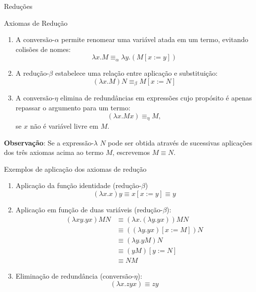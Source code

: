\begin{frame}[fragile]{Reduções}

    \begin{footnotesize}
    \begin{block}{Axiomas de Redução}
        \begin{enumerate}
            \item A conversão-$\alpha$ permite renomear uma variável atada em um termo,
            evitando colisões de nomes:
            \[
                \lambda x.M \equiv_\alpha \lambda y.(M[x:=y])
            \]

            \item A redução-$\beta$ estabelece uma relação entre aplicação e substituição:
            \[
                (\lambda x.M)N \equiv_\beta M[x:=N]
            \]

            \item A  conversão-$\eta$ elimina de redundâncias em expressões cujo
                propósito é apenas repassar o argumento para um termo:
            \[
                (\lambda x.Mx) \equiv_\eta M,
            \]
            se $x$ não é variável livre em $M$.
        \end{enumerate}
    \end{block}

    \textbf{Observação}: Se a expressão-$\lambda$ $N$ pode ser obtida através de sucessivas 
        aplicações dos três axiomas acima ao termo $M$, escrevemos $M\equiv N$.
    \end{footnotesize}
\end{frame}

\begin{frame}[fragile]{Exemplos de aplicação dos axiomas de redução}

    \begin{enumerate}
        \item Aplicação da função identidade (redução-$\beta$)
        \[
            (\lambda x.x)y \equiv x[x:=y] \equiv y
        \]

        \item Aplicação em função de duas variáveis (redução-$\beta$):
        \begin{align*}
            (\lambda xy.yx)MN & \equiv (\lambda x.(\lambda y.yx))MN \\
            & \equiv ((\lambda y.yx)[x:=M])N \\
            & \equiv (\lambda y.yM)N \\
            & \equiv (yM)[y:=N] \\
            & \equiv NM
        \end{align*}

        \item Eliminação de redundância (conversão-$\eta$):
        \[
            (\lambda x.zyx) \equiv zy
        \]
    \end{enumerate}

\end{frame}

